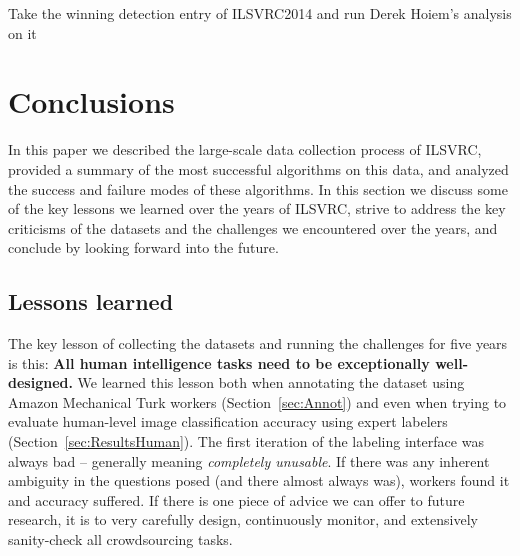 Take the winning detection entry of ILSVRC2014 and run Derek Hoiem's analysis on it
\fi


\section{Conclusions}
\label{sec:Conclusion}

In this paper we described the large-scale data collection process of ILSVRC, provided a summary of the most successful algorithms on this data, and analyzed the success and failure modes of these algorithms. In this section we discuss some of the key lessons we learned over the years of ILSVRC, strive to address the key criticisms of the datasets and the challenges we encountered over the years, and conclude by looking forward into the future.

\subsection{Lessons learned}

The key lesson of collecting the datasets and running the challenges for five years is this: {\bf All human intelligence tasks need to be exceptionally well-designed.} We learned this lesson both when annotating the dataset using Amazon Mechanical Turk workers (Section~\ref{sec:Annot}) and even
when trying to evaluate human-level image classification accuracy using expert labelers (Section~\ref{sec:ResultsHuman}).  The first iteration of the labeling interface was always bad -- generally meaning \emph{completely unusable}. If there was any inherent ambiguity in the questions posed (and there almost always was), workers found it and accuracy suffered. If there is one piece of advice we can offer to future research, it is to very carefully design, continuously monitor, and extensively sanity-check all crowdsourcing tasks. 

